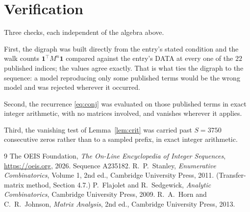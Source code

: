 \documentclass[11pt,a4paper]{article}
\theoremstyle{plain}
\theoremstyle{definition}
\begin{document}
\section{Verification}

Three checks, each independent of the algebra above.

First, the digraph was built directly from the entry's stated condition and the walk counts
$\mathbf{1}^{\!\top}M^{n}\mathbf{1}$ compared against the entry's DATA at every one of
the $22$ published indices; the values agree exactly. That is what ties the digraph to
the sequence: a model reproducing only some published terms would be the wrong model and
was rejected wherever it occurred.

Second, the recurrence \eqref{eq:conj} was evaluated on those published terms in exact
integer arithmetic, with no matrices involved, and vanishes wherever it applies.

Third, the vanishing test of Lemma~\ref{lem:crit} was carried past $S=3750$ consecutive
zeros rather than to a sampled prefix, in exact integer arithmetic.

\begin{thebibliography}{9}
 The OEIS Foundation, \emph{The On-Line Encyclopedia of Integer
Sequences}, \url{https://oeis.org}, 2026. Sequence A235182.
 R.~P.~Stanley, \emph{Enumerative Combinatorics}, Volume 1, 2nd ed.,
Cambridge University Press, 2011. (Transfer-matrix method, Section 4.7.)
 P.~Flajolet and R.~Sedgewick, \emph{Analytic Combinatorics}, Cambridge
University Press, 2009.
 R.~A.~Horn and C.~R.~Johnson, \emph{Matrix Analysis}, 2nd ed., Cambridge
University Press, 2013.
\end{thebibliography}
\end{document}
